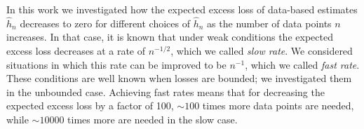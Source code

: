 \documentclass{uvamath}
\theoremstyle{remark}
\theoremstyle{definition}
\theoremstyle{definition}
\theoremstyle{definition}
\theoremstyle{definition}
\theoremstyle{definition}
\begin{document}
In this work we investigated how the expected excess loss of
data-based estimates $\hat{h}_n$ decreases to zero for different
choices of $\hat{h}_n$ as the number of data points $n$ increases. In
that case, it is known that under weak conditions the expected excess
loss decreases at a rate of $n^{-1/2}$, which we called \textit{slow
  rate}. We considered situations in which this rate can be improved
to be $n^{-1}$, which we called \textit{fast rate}. These conditions
are well known when losses are bounded; we investigated them in the
unbounded case. Achieving fast rates means that for decreasing the
expected excess loss by a factor of 100, $\sim 100$ times more data
points are needed, while $\sim 10000$ times more are needed in the
slow case.








\end{document}
